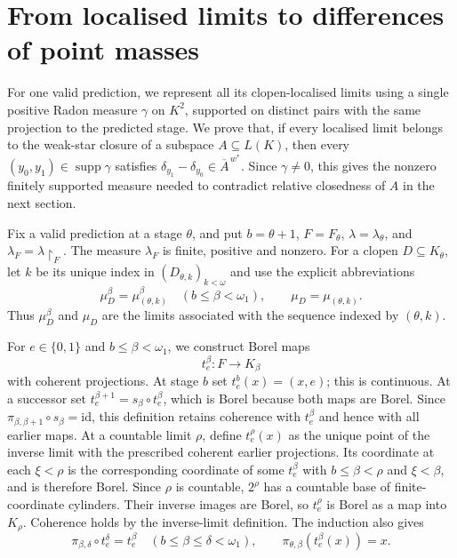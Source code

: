 \documentclass[a4paper,11pt]{amsart}
\theoremstyle{plain}
\theoremstyle{definition}
\theoremstyle{remark}
\newcommand{\supp}{\operatorname{supp}}
\newcommand{\restr}[1]{{\restriction_{#1}}}
\numberwithin{equation}{section}
\begin{document}
\section{From localised limits to differences of point masses}\label{sec:coupling}

For one valid prediction, we represent all its clopen-localised limits
using a single positive Radon measure $\gamma$ on $K^2$, supported on
distinct pairs with the same projection to the predicted stage.
We prove that, if every localised limit belongs to the weak-star closure
of a subspace $A\subseteq L(K)$, then every
$(y_0,y_1)\in\supp\gamma$ satisfies
$\delta_{y_1}-\delta_{y_0}\in\overline A^{\,w^*}$.
Since $\gamma\neq0$, this gives the nonzero finitely supported measure
needed to contradict relative closedness of $A$ in the next section.

Fix a valid prediction at a stage $\theta$, and put $b=\theta+1$, $F=F_\theta$, $\lambda=\lambda_\theta$, and $\lambda_F=\lambda\restr{F}$.  The measure $\lambda_F$ is finite, positive and nonzero.  For a clopen $D\subseteq K_\theta$, let $k$ be its unique index in $(D_{\theta,k})_{k<\omega}$ and use the explicit abbreviations
\[
 \mu_D^\beta=\mu_{(\theta,k)}^\beta
 \quad(b\leqslant\beta<\omega_1),
 \qquad \mu_D=\mu_{(\theta,k)}.
\]
Thus $\mu_D^\beta$ and $\mu_D$ are the limits associated with the sequence indexed by $(\theta,k)$.

For $e\in\{0,1\}$ and $b\leqslant\beta<\omega_1$, we construct Borel maps
\[
 t_e^\beta:F\longrightarrow K_\beta
\]
with coherent projections.  At stage $b$ set $t_e^b(x)=(x,e)$; this is continuous.  At a successor set
$t_e^{\beta+1}=s_\beta\circ t_e^\beta$, which is Borel because both maps are Borel.  Since
$\pi_{\beta,\beta+1}\circ s_\beta=\mathrm{id}$, this definition retains coherence with $t_e^\beta$ and hence with all earlier maps.  At a countable limit $\rho$, define $t_e^\rho(x)$ as the unique point of the inverse limit with the prescribed coherent earlier projections.  Its coordinate at each $\xi<\rho$ is the corresponding coordinate of some $t_e^\beta$ with $b\leqslant\beta<\rho$ and $\xi<\beta$, and is therefore Borel.  Since $\rho$ is countable, $2^\rho$ has a countable base of finite-coordinate cylinders.  Their inverse images are Borel, so $t_e^\rho$ is Borel as a map into $K_\rho$.  Coherence holds by the inverse-limit definition.  The induction also gives
\begin{equation}\label{eq:section-coherence}
 \pi_{\beta,\delta}\circ t_e^\delta=t_e^\beta
 \quad(b\leqslant\beta\leqslant\delta<\omega_1),
 \qquad \pi_{\theta,\beta}(t_e^\beta(x))=x.
\end{equation}
\end{document}
